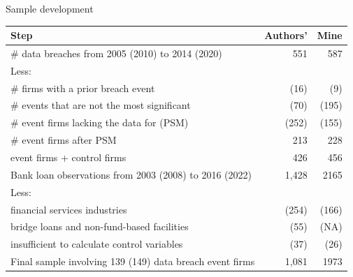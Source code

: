 \documentclass[13pt]{beamer}
\begin{document}
\begin{frame}
  {Sample development}
  \scriptsize
  \begin{table}[ht]
    \centering
    \label{my-label}
    \begin{tabular}{@{}lrr@{}}
      \toprule
      \textbf{Step}                                            & \textbf{Authors'} & \textbf{Mine} \\ \midrule
      \# data breaches from 2005 (2010) to 2014 (2020)         & 551               & 587           \\
      Less:                                                    &                   &               \\
      \quad \# firms with a prior breach event                 & (16)              & (9)           \\
      \quad \# events that are not the most significant        & (70)              & (195)         \\
      \quad \# event firms lacking the data for (PSM)          & (252)             & (155)         \\
      \# event firms after PSM                                 & 213               & 228           \\
      event firms + control firms                              & 426               & 456           \\
      Bank loan observations from 2003 (2008) to 2016 (2022)   & 1,428             & 2165          \\
      Less:                                                    &                   &               \\
      \quad financial services industries                      & (254)             & (166)         \\
      \quad bridge loans and non-fund-based facilities         & (55)              & (NA)          \\
      \quad insufficient to calculate control variables        & (37)              & (26)          \\
      Final sample involving 139 (149) data breach event firms & 1,081             & 1973          \\ \bottomrule
    \end{tabular}
  \end{table}
\end{frame}
\end{document}
